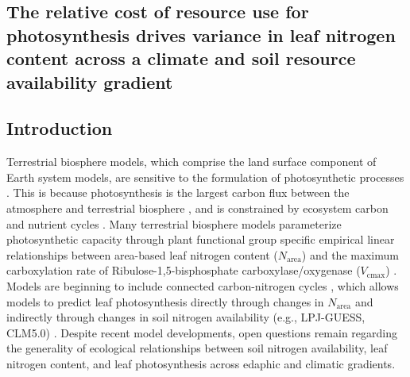 \begin{singlespace}
    \chapter{\textbf{The relative cost of resource use for photosynthesis drives variance in leaf nitrogen content across a climate and soil resource availability gradient}}
\end{singlespace}

\section{Introduction}
\noindent Terrestrial biosphere models, which comprise the land surface component of Earth system models, are sensitive to the formulation of photosynthetic processes . This is because photosynthesis is the largest carbon flux between the atmosphere and terrestrial biosphere , and is constrained by ecosystem carbon and nutrient cycles . Many terrestrial biosphere models parameterize photosynthetic capacity through plant functional group specific empirical linear relationships between area-based leaf nitrogen content ($N_\mathrm{area}$) and the maximum carboxylation rate of Ribulose-1,5-bisphosphate carboxylase/oxygenase ($V_\mathrm{cmax}$) . Models are beginning to include connected carbon-nitrogen cycles , which allows models to predict leaf photosynthesis directly through changes in $N_\mathrm{area}$ and indirectly through changes in soil nitrogen availability (e.g., LPJ-GUESS, CLM5.0) . Despite recent model developments, open questions remain regarding the generality of ecological relationships between soil nitrogen availability, leaf nitrogen content, and leaf photosynthesis across edaphic and climatic gradients.

